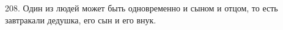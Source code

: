 208. Один из людей может быть одновременно и сыном и отцом, то есть завтракали дедушка, его сын и его внук.\\
